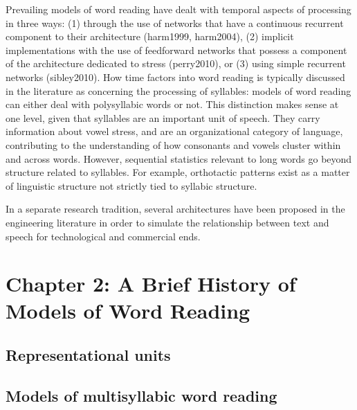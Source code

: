 \documentclass[
  american,
  man,floatsintext]{apa6}
\begin{document}
Prevailing models of word reading have dealt with temporal aspects of processing in three ways: (1) through the use of networks that have a continuous recurrent component to their architecture (harm1999, harm2004), (2) implicit implementations with the use of feedforward networks that possess a component of the architecture dedicated to stress (perry2010), or (3) using simple recurrent networks (sibley2010). How time factors into word reading is typically discussed in the literature as concerning the processing of syllables: models of word reading can either deal with polysyllabic words or not. This distinction makes sense at one level, given that syllables are an important unit of speech. They carry information about vowel stress, and are an organizational category of language, contributing to the understanding of how consonants and vowels cluster within and across words. However, sequential statistics relevant to long words go beyond structure related to syllables. For example, orthotactic patterns exist as a matter of linguistic structure not strictly tied to syllabic structure.

In a separate research tradition, several architectures have been proposed in the engineering literature in order to simulate the relationship between text and speech for technological and commercial ends.

\hypertarget{chapter-2-a-brief-history-of-models-of-word-reading}{%
\section{Chapter 2: A Brief History of Models of Word Reading}\label{chapter-2-a-brief-history-of-models-of-word-reading}}

\hypertarget{representational-units}{%
\subsection{Representational units}\label{representational-units}}

\hypertarget{models-of-multisyllabic-word-reading}{%
\subsection{Models of multisyllabic word reading}\label{models-of-multisyllabic-word-reading}}
\end{document}

